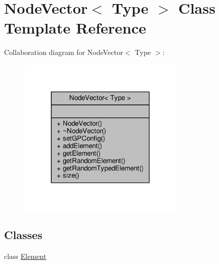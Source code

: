 \hypertarget{classNodeVector}{}\section{Node\+Vector$<$ Type $>$ Class Template Reference}
\label{classNodeVector}


Collaboration diagram for Node\+Vector$<$ Type $>$\+:
\nopagebreak
\begin{figure}[H]
\begin{center}
\leavevmode
\includegraphics[width=225pt]{classNodeVector__coll__graph}
\end{center}
\end{figure}
\subsection*{Classes}
\begin{DoxyCompactItemize}
\item 
class \hyperlink{classNodeVector_1_1Element}{Element}
\end{DoxyCompactItemize}
